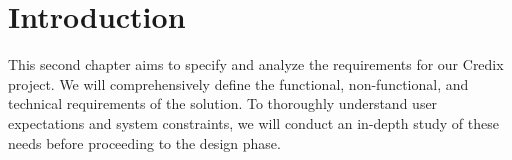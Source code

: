 \section*{Introduction}

This second chapter aims to specify and analyze the requirements for our Credix project. We will comprehensively define the functional, non-functional, and technical requirements of the solution. To thoroughly understand user expectations and system constraints, we will conduct an in-depth study of these needs before proceeding to the design phase.
